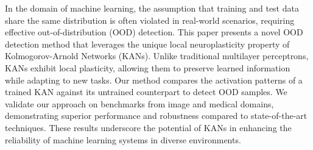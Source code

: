In the domain of machine learning, the assumption that training and test data share the same distribution is often violated in real-world scenarios, requiring effective out-of-distribution (OOD) detection. 
This paper presents a novel OOD detection method that leverages the unique local neuroplasticity property of Kolmogorov-Arnold Networks (KANs). 
Unlike traditional multilayer perceptrons, KANs exhibit local plasticity, allowing them to preserve learned information while adapting to new tasks. 
Our method compares the activation patterns of a trained KAN against its untrained counterpart to detect OOD samples. 
We validate our approach on benchmarks from image and medical domains, demonstrating superior performance and robustness compared to state-of-the-art techniques. 
These results underscore the potential of KANs in enhancing the reliability of machine learning systems in diverse environments.